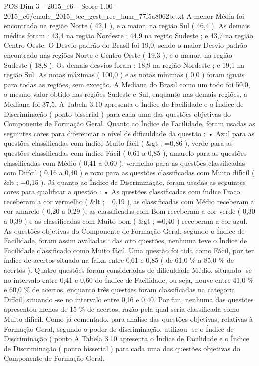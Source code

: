 \begin{textsample}{POS Dim 3 – 2015\_c6 – Score 1.00 – 2015\_c6/enade\_2015\_tec\_gest\_rec\_hum\_77f5a8062b.txt}
A menor Média foi encontrada na região Norte ( 42,1 ), e a maior, na região Sul ( 46,4 ).
As demais médias foram : 43,4 na região Nordeste ; 44,9 na região Sudeste ; e 43,7 na região Centro-Oeste.
O Desvio padrão do Brasil foi 19,0, sendo o maior Desvio padrão encontrado nas regiões Norte e Centro-Oeste ( 19,3 ), e o menor, na região Sudeste ( 18,8 ).
Os demais desvios foram : 18,9 na região Nordeste ; e 19,1 na região Sul.
As notas máximas ( 100,0 ) e as notas mínimas ( 0,0 ) foram iguais para todas as regiões, sem exceção.
A Mediana do Brasil como um todo foi 50,0, o mesmo valor obtido nas regiões Sudeste e Sul, enquanto nas demais regiões, a Mediana foi 37,5.
A Tabela 3.10 apresenta o Índice de Facilidade e o Índice de Discriminação ( ponto bisserial ) para cada uma das questões objetivas do Componente de Formação Geral.
Quanto ao Índice de Facilidade, foram usadas as seguintes cores para diferenciar o nível de dificuldade da questão : • Azul para as questões classificadas com índice Muito fácil ( \&gt ; =0,86 ), verde para as questões classificadas com índice Fácil ( 0,61 a 0,85 ), amarelo para as questões classificadas com Médio ( 0,41 a 0,60 ), vermelho para as questões classificadas com Difícil ( 0,16 a 0,40 ) e roxo para as questões classificadas com Muito difícil ( \&lt ; =0,15 ).
Já quanto ao Índice de Discriminação, foram usadas as seguintes cores para qualificar a questão : • As questões classificadas com índice Fraco receberam a cor vermelho ( \&lt ; =0,19 ), as classificadas com Médio receberam a cor amarelo ( 0,20 a 0,29 ), as classificadas com Bom receberam a cor verde ( 0,30 a 0,39 ) e as classificadas com Muito bom ( \&gt ; =0,40 ) receberam a cor azul.
As questões objetivas do Componente de Formação Geral, segundo o Índice de Facilidade, foram assim avaliadas : das oito questões, nenhuma teve o Índice de Facilidade classificado como Muito fácil.
Uma questão foi tida como Fácil, por ter índice de acertos situado na faixa entre 0,61 e 0,85 ( de 61,0 \% a 85,0 \% de acertos ).
Quatro questões foram consideradas de dificuldade Médio, situando -se no intervalo entre 0,41 e 0,60 do Índice de Facilidade, ou seja, houve entre 41,0 \% e 60,0 \% de acertos, enquanto três questões foram classificadas na categoria Difícil, situando -se no intervalo entre 0,16 e 0,40.
Por fim, nenhuma das questões apresentou menos de 15 \% de acertos, razão pela qual seria classificada como Muito difícil.
Como já comentado, para análise das questões objetivas, relativas à Formação Geral, segundo o poder de discriminação, utilizou -se o Índice de Discriminação ( ponto A Tabela 3.10 apresenta o Índice de Facilidade e o Índice de Discriminação ( ponto bisserial ) para cada uma das questões objetivas do Componente de Formação Geral.

\end{textsample}

